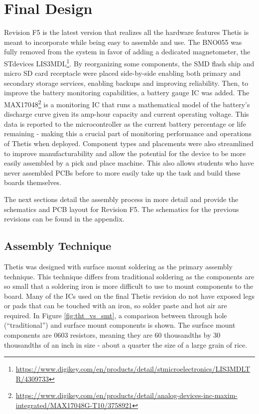 \section{Final Design} 
Revision F5 is the latest version that realizes all the hardware features Thetis is meant to incorporate while being easy to assemble and use.
The BNO055 was fully removed from the system in favor of adding a dedicated magnetometer, the STdevices LIS3MDL\footnote{\url{https://www.digikey.com/en/products/detail/stmicroelectronics/LIS3MDLTR/4309733}}.
By reorganizing some components, the SMD flash ship and micro SD card receptacle were placed side-by-side enabling both primary and secondary storage services, enabling backups and improving reliability.
Then, to improve the battery monitoring capabilities, a battery gauge IC was added.
The MAX17048\footnote{\url{https://www.digikey.com/en/products/detail/analog-devices-inc-maxim-integrated/MAX17048G-T10/3758921}} is a monitoring IC that runs a mathematical model of the battery's discharge curve given its amp-hour capacity and current operating voltage.
This data is reported to the microcontroller as the current battery percentage or life remaining - making this a crucial part of monitoring performance and operations of Thetis when deployed.
Component types and placements were also streamlined to improve manufacturability and allow the potential for the device to be more easily assembled by a pick and place machine.
This also allows students who have never assembled PCBs before to more easily take up the task and build these boards themselves.


The next sections detail the assembly process in more detail and provide the schematics and PCB layout for Revision F5.
The schematics for the previous revisions can be found in the appendix.

% 

\subsection{Assembly Technique} 
Thetis was designed with surface mount soldering as the primary assembly technique.
This technique differs from traditional soldering as the components are so small that a soldering iron is more difficult to use to mount components to the board.
Many of the ICs used on the final Thetis revision do not have exposed legs or pads that can be touched with an iron, so solder paste and hot air are required.
In Figure \ref{fig:tht_vs_smt}, a comparison between through hole (``traditional'') and surface mount components is shown.
The surface mount components are 0603 resistors, meaning they are 60 thousandths by 30 thousandths of an inch in size - about a quarter the size of a large grain of rice.

